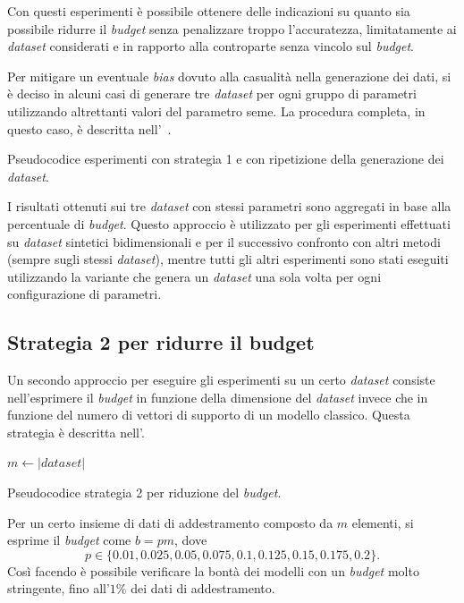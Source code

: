 Con questi esperimenti è possibile ottenere delle indicazioni su quanto sia possibile ridurre il \emph{budget} senza penalizzare troppo l'accuratezza, limitatamente ai \emph{dataset} considerati e in rapporto alla controparte senza vincolo sul \emph{budget}.

Per mitigare un eventuale \emph{bias} dovuto alla casualità nella generazione dei dati, si è deciso in alcuni casi di generare tre \emph{dataset} per ogni gruppo di parametri utilizzando altrettanti valori del parametro seme.
La procedura completa, in questo caso, è descritta nell'~.
\begin{algorithm}[t]
    \SetAlgoLined
\caption{Pseudocodice esperimenti con strategia 1 e con ripetizione della generazione dei \emph{dataset}.}
\label{alg:esperimenti_2}
\end{algorithm}
I risultati ottenuti sui tre \emph{dataset} con stessi parametri sono aggregati in base alla percentuale di \emph{budget}.
Questo approccio è utilizzato per gli esperimenti effettuati su \emph{dataset} sintetici bidimensionali e per il successivo confronto con altri metodi (sempre sugli stessi \emph{dataset}), mentre tutti gli altri esperimenti sono stati eseguiti utilizzando la variante che genera un \emph{dataset} una sola volta per ogni configurazione di parametri.

\subsection{Strategia 2 per ridurre il budget}
Un secondo approccio per eseguire gli esperimenti su un certo \emph{dataset} consiste nell'esprimere il \emph{budget} in funzione della dimensione del \emph{dataset} invece che in funzione del numero di vettori di supporto di un modello classico.
Questa strategia è descritta nell'.
\begin{algorithm}
    \SetAlgoLined
    $m \gets |\textit{dataset}|$\;
\caption{Pseudocodice strategia 2 per riduzione del \emph{budget}.}
\label{alg:esperimenti_3}
\end{algorithm}
Per un certo insieme di dati di addestramento composto da $m$ elementi, si esprime il \emph{budget} come $b=pm$, dove
\begin{equation*}
    p\in\{0.01, 0.025, 0.05, 0.075, 0.1, 0.125, 0.15, 0.175, 0.2\}.
\end{equation*}
Così facendo è possibile verificare la bontà dei modelli con un \emph{budget} molto stringente, fino all'$1\%$ dei dati di addestramento.

